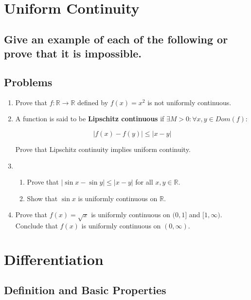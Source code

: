 \documentclass{article}
\theoremstyle{definition}
\newcommand{\R}{\mathbb{R}}
\begin{document}
\newpage

\section{Uniform Continuity}

\subsection{Give an example of each of the following or prove that it is impossible.}

\subsection{Problems}

\begin{enumerate}
    \item Prove that $f: \R \xrightarrow{} \R$ defined by $f(x) = x^{2}$ is not uniformly continuous.

    \item A function is said to be \textbf{Lipschitz continuous} if $\exists M > 0: \forall x,y \in Dom(f):$

    \[ \lvert f(x) - f(y) \rvert \leq \lvert x - y \rvert\]

    Prove that Lipschitz continuity implies uniform continuity.
    \item 
    
    \begin{enumerate}
        \item Prove that $\lvert \sin x - \sin y \rvert \leq \lvert x - y \rvert $ for all $x,y \in \R$.
        \item Show that $\sin x$ is uniformly continuous on $\R$.
    \end{enumerate}

    \item Prove that $f(x) = \sqrt{x}$ is uniformly continuous on $(0,1]$ and $[1,\infty)$. Conclude that $f(x)$ is uniformly continuous on $(0,\infty)$.
    
\end{enumerate}

\newpage

\section{Differentiation}

\subsection{Definition and Basic Properties}
\end{document}
